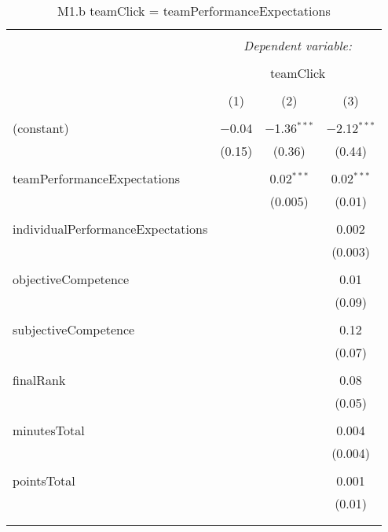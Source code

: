 
\begin{table}[!htbp] \centering 
  \caption{M1.b teamClick = teamPerformanceExpectations} 
  \label{tab:MLM1bteamExpectationsClick} 
\footnotesize 
\begin{tabular}{@{\extracolsep{5pt}}lccc} 
\\[-1.8ex]\hline 
\hline \\[-1.8ex] 
 & \multicolumn{3}{c}{\textit{Dependent variable:}} \\ 
\cline{2-4} 
\\[-1.8ex] & \multicolumn{3}{c}{teamClick} \\ 
\\[-1.8ex] & (1) & (2) & (3)\\ 
\hline \\[-1.8ex] 
 (constant) & $-$0.04 & $-$1.36$^{***}$ & $-$2.12$^{***}$ \\ 
  & (0.15) & (0.36) & (0.44) \\ 
  & & & \\ 
 teamPerformanceExpectations &  & 0.02$^{***}$ & 0.02$^{***}$ \\ 
  &  & (0.005) & (0.01) \\ 
  & & & \\ 
 individualPerformanceExpectations &  &  & 0.002 \\ 
  &  &  & (0.003) \\ 
  & & & \\ 
 objectiveCompetence &  &  & 0.01 \\ 
  &  &  & (0.09) \\ 
  & & & \\ 
 subjectiveCompetence &  &  & 0.12 \\ 
  &  &  & (0.07) \\ 
  & & & \\ 
 finalRank &  &  & 0.08 \\ 
  &  &  & (0.05) \\ 
  & & & \\ 
 minutesTotal &  &  & 0.004 \\ 
  &  &  & (0.004) \\ 
  & & & \\ 
 pointsTotal &  &  & 0.001 \\ 
  &  &  & (0.01) \\ 
  & & & \\ 
\hline \\[-1.8ex] 

\end{tabular}
\end{table}
